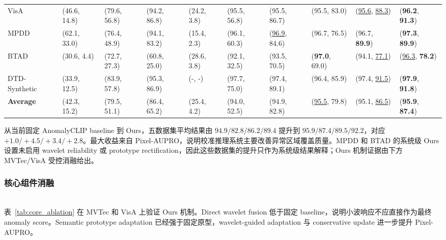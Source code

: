 \documentclass[runningheads]{llncs}
\begin{document}
\begin{table}[htbp]
{\begin{tabular}{llllllllll}
      VisA & (46.6, 14.8) & (79.6, 56.8) & (94.2, 86.8) & (24.2, 3.8) & (95.5, 56.8) & (95.5, 86.7) & (95.5, 83.0) & (\underline{95.6}, \underline{88.3}) & (\textbf{96.2}, \textbf{91.3}) \\
      MPDD & (62.1, 33.0) & (76.4, 48.9) & (94.1, 83.2) & (15.4, 2.3) & (96.1, 60.3) & (\underline{96.9}, 84.6) & (96.7, 76.5) & (96.7, \textbf{89.9}) & (\textbf{97.3}, \textbf{89.9}) \\
      BTAD & (30.6, 4.4) & (72.7, 27.3) & (60.8, 25.0) & (28.6, 3.8) & (92.1, 32.5) & (93.5, 70.5) & (\textbf{97.0}, 69.0) & (94.1, \underline{77.1}) & (\underline{96.3}, \textbf{78.2}) \\
      DTD-Synthetic & (33.9, 12.5) & (83.9, 57.8) & (95.3, 86.9) & (-, -) & (97.7, 75.0) & (97.4, 89.1) & (96.4, 85.9) & (97.4, \underline{91.5}) & (\textbf{97.9}, \textbf{91.8}) \\
      \midrule
      \textbf{Average} & (42.3, 15.2) & (79.5, 51.1) & (86.4, 65.2) & (25.4, 4.2) & (94.0, 52.5) & (94.9, 82.8) & (\underline{95.5}, 79.8) & (95.1, \underline{86.5}) & (\textbf{95.9}, \textbf{87.4}) \\
      \bottomrule
    \end{tabular}%
  }
\end{table}

从当前固定 AnomalyCLIP baseline 到 Ours，五数据集平均结果由 $94.9/82.8/86.2/89.4$ 提升到 $95.9/87.4/89.5/92.2$，对应 $+1.0/+4.5/+3.4/+2.8$。最大收益来自 Pixel-AUPRO，说明校准推理系统主要改善异常区域覆盖质量。MPDD 和 BTAD 的系统级 Ours 设置未启用 wavelet reliability 或 prototype rectification，因此这些数据集的提升只作为系统级结果解释；Ours 机制证据由下方 MVTec/VisA 受控消融给出。

\subsubsection{核心组件消融}
\mbox{}\\
\noindent
表~\ref{tab:core_ablation} 在 MVTec 和 VisA 上验证 Ours 机制。Direct wavelet fusion 低于固定 baseline，说明小波响应不应直接作为最终 anomaly score。Semantic prototype adaptation 已经强于固定原型，wavelet-guided adaptation 与 conservative update 进一步提升 Pixel-AUPRO。
\end{document}

